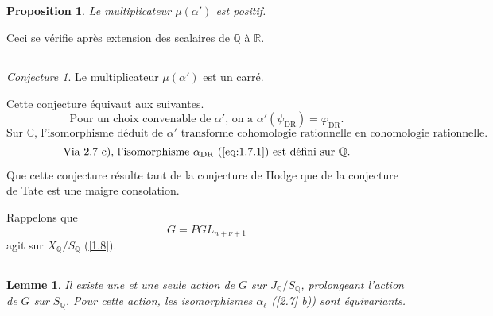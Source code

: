\documentclass[10pt,leqno]{amsart}
\theoremstyle{plain}
\newtheorem{lemma}[theorem]{Lemme}
\newtheorem{proposition}[theorem]{Proposition}
\theoremstyle{definition}
\theoremstyle{remark}
\newtheorem*{conjecture}{Conjecture}
\newcommand{\QQ}{\mathbb{Q}}
\newcommand{\CC}{\mathbb{C}}
\newcommand{\RR}{\mathbb{R}}
\begin{document}
\subsection{}\label{2.9}

\begin{proposition}\label{prop:2.9}
Le multiplicateur $\mu(\alpha')$ est positif.
\end{proposition}

Ceci se v\'erifie apr\`es extension des scalaires de $\QQ$ \`a $\RR$.

\subsection{}\label{2.10}

\begin{conjecture}\label{conj:2.10}
Le multiplicateur $\mu(\alpha')$ est un carr\'e.
\end{conjecture}

Cette conjecture \'equivaut aux suivantes.
\begin{equation}\label{eq:2.10.1}
\text{Pour un choix convenable de $\alpha'$, on a $\alpha'(\psi_{\mathrm{DR}})=\varphi_{\mathrm{DR}}$.}
\end{equation}
\begin{equation}\label{eq:2.10.2}
\text{Sur $\CC$, l'isomorphisme d\'eduit de $\alpha'$ transforme cohomologie rationnelle en cohomologie rationnelle.}
\end{equation}
\begin{equation}\label{eq:2.10.3}
\text{Via 2.7 c), l'isomorphisme $\alpha_{\mathrm{DR}}$ (\ref{eq:1.7.1}) est d\'efini sur $\QQ$.}
\end{equation}
Que cette conjecture r\'esulte tant de la conjecture de Hodge que de la conjecture de Tate est une maigre consolation.

Rappelons que
\[
G=PGL_{n+\nu+1}
\]
agit sur $X_\QQ/S_\QQ$ (\ref{1.8}).

\subsection{}\label{2.11}

\begin{lemma}\label{lem:2.11}
Il existe une et une seule action de $G$ sur $J_\QQ/S_\QQ$, prolongeant l'action de $G$ sur $S_\QQ$. Pour cette action, les isomorphismes $\alpha_\ell$ (\ref{2.7} b)) sont \'equivariants.
\end{lemma}
\end{document}
